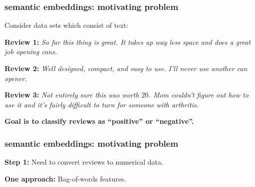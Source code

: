 \documentclass[handout,compress]{beamer}
\begin{document}
\begin{frame}
	\frametitle{semantic embeddings: motivating problem}
	Consider data sets which consist of text:
	
	\textbf{Review 1:} \textit{So far this thing is great. It takes up way less space and does a great job opening cans.}
	
	\textbf{Review 2:} \textit{Well designed, compact, and easy to use. I’ll never use another can opener.} 
	
	\textbf{Review 3:} \textit{Not entirely sure this was worth $20$. Mom couldn't figure out how to use it and it's fairly difficult to turn for someone with arthritis.}
	
	\begin{center}
		\textbf{\alert{Goal is to classify reviews as ``positive'' or ``negative''.}}
	\end{center}\end{frame}

\begin{frame}
	\frametitle{semantic embeddings: motivating problem}
	\textbf{Step 1:} Need to convert reviews to numerical data.
	
	\textbf{One approach:} Bag-of-words features.  
	
\end{frame}
\end{document}
